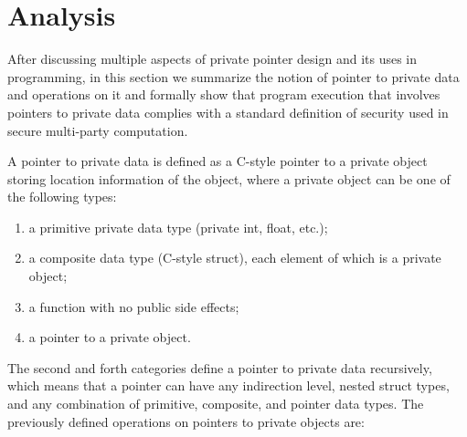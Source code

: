 \documentclass[11pt]{article}
\begin{document}
\section{Analysis}
\label{sec:analysis}

After discussing multiple aspects of private pointer design and its uses in
programming, in this section we summarize the notion of pointer to private
data and operations on it and formally show that program execution that
involves pointers to private data complies with a standard definition of
security used in secure multi-party computation. 

A pointer to private data is defined as a C-style pointer to a private
object storing location information of the object, where a private object
can be one of the following types:
\begin{enumerate}
  \item a primitive private data type (private int, float, etc.);
  \item a composite data type (C-style struct), each element of which is a
    private object;
  \item a function with no public side effects;
  \item a pointer to a private object.
\end{enumerate}
The second and forth categories define a pointer to private data
recursively, which means that a pointer can have any indirection level,
nested struct types, and any combination of primitive, composite, and
pointer data types. 
The previously defined operations on pointers to private objects are:
\end{document}
